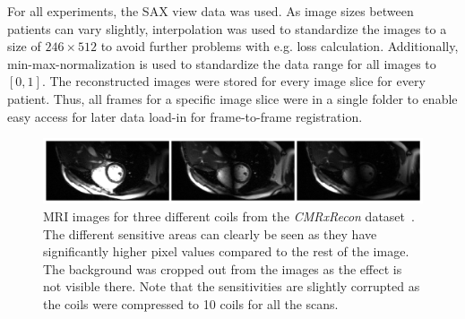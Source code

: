 For all experiments, the SAX view data was used. As image sizes between patients can vary slightly, interpolation was used to standardize the images to a size of $246 \times 512$ to avoid further problems with e.g. 
loss calculation. Additionally, min-max-normalization is used to standardize the data range for all images to $[0,1]$. The reconstructed images were stored for every image slice for every patient. Thus, all frames for a specific image slice were in a single folder to enable easy access for later data load-in for frame-to-frame registration.

\begin{figure}[h]%
	\centering
	\graphicspath{{images/}{\main/images/}}
	\includegraphics[width=\linewidth]{Coils.png} 
	\caption{MRI images for three different coils from the \emph{CMRxRecon} dataset~\cite{CMRxRecon}. The different sensitive areas can clearly be seen as they have significantly higher pixel values compared to the rest of the image. The background was cropped out from the images as the effect is not visible there. Note that the sensitivities are slightly corrupted as the coils were compressed to 10 coils for all the scans.}
	\label{fig:Coils}
\end{figure}


